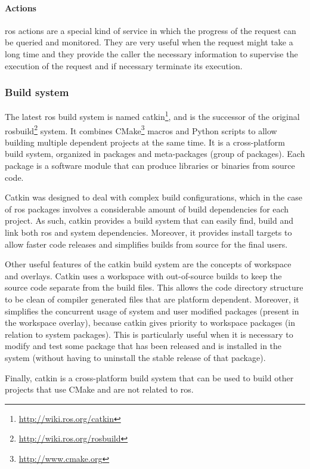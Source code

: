 \paragraph{Actions}

\gls{ros} actions are a special kind of service in which the progress of the request can be queried and monitored. They are very useful when the request might take a long time and they provide the caller the necessary information to supervise the execution of the request and if necessary terminate its execution.


\subsubsection{Build system}

The latest \gls{ros} build system is named catkin\footnote{\url{http://wiki.ros.org/catkin}}, and is the successor of the original rosbuild\footnote{\url{http://wiki.ros.org/rosbuild}} system. It combines CMake\footnote{\url{http://www.cmake.org}} macros and Python scripts to allow building multiple dependent projects at the same time. It is a cross-platform build system, organized in packages and meta-packages (group of packages). Each package is a software module that can produce libraries or binaries from source code.

Catkin was designed to deal with complex build configurations, which in the case of \gls{ros} packages involves a considerable amount of build dependencies for each project. As such, catkin provides a build system that can easily find, build and link both \gls{ros} and system dependencies. Moreover, it provides install targets to allow faster code releases and simplifies builds from source for the final users.

Other useful features of the catkin build system are the concepts of workspace and overlays. Catkin uses a workspace with out-of-source builds to keep the source code separate from the build files. This allows the code directory structure to be clean of compiler generated files that are platform dependent. Moreover, it simplifies the concurrent usage of system and user modified packages (present in the workspace overlay), because catkin gives priority to workspace packages (in relation to system packages). This is particularly useful when it is necessary to modify and test some package that has been released and is installed in the system (without having to uninstall the stable release of that package).

Finally, catkin is a cross-platform build system that can be used to build other projects that use CMake and are not related to \gls{ros}.


